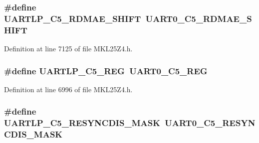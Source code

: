 \subsubsection[{\texorpdfstring{U\+A\+R\+T\+L\+P\+\_\+\+C5\+\_\+\+R\+D\+M\+A\+E\+\_\+\+S\+H\+I\+FT}{UARTLP_C5_RDMAE_SHIFT}}]{\setlength{\rightskip}{0pt plus 5cm}\#define U\+A\+R\+T\+L\+P\+\_\+\+C5\+\_\+\+R\+D\+M\+A\+E\+\_\+\+S\+H\+I\+FT~{\bf U\+A\+R\+T0\+\_\+\+C5\+\_\+\+R\+D\+M\+A\+E\+\_\+\+S\+H\+I\+FT}}\hypertarget{group___backward___compatibility___symbols_gabf5bb3ff2b944bfdbfd8b05f29c7b678}{}\label{group___backward___compatibility___symbols_gabf5bb3ff2b944bfdbfd8b05f29c7b678}


Definition at line 7125 of file M\+K\+L25\+Z4.\+h.

\subsubsection[{\texorpdfstring{U\+A\+R\+T\+L\+P\+\_\+\+C5\+\_\+\+R\+EG}{UARTLP_C5_REG}}]{\setlength{\rightskip}{0pt plus 5cm}\#define U\+A\+R\+T\+L\+P\+\_\+\+C5\+\_\+\+R\+EG~{\bf U\+A\+R\+T0\+\_\+\+C5\+\_\+\+R\+EG}}\hypertarget{group___backward___compatibility___symbols_gabc0ed230faba55a9874ca37a592326b3}{}\label{group___backward___compatibility___symbols_gabc0ed230faba55a9874ca37a592326b3}


Definition at line 6996 of file M\+K\+L25\+Z4.\+h.

\subsubsection[{\texorpdfstring{U\+A\+R\+T\+L\+P\+\_\+\+C5\+\_\+\+R\+E\+S\+Y\+N\+C\+D\+I\+S\+\_\+\+M\+A\+SK}{UARTLP_C5_RESYNCDIS_MASK}}]{\setlength{\rightskip}{0pt plus 5cm}\#define U\+A\+R\+T\+L\+P\+\_\+\+C5\+\_\+\+R\+E\+S\+Y\+N\+C\+D\+I\+S\+\_\+\+M\+A\+SK~{\bf U\+A\+R\+T0\+\_\+\+C5\+\_\+\+R\+E\+S\+Y\+N\+C\+D\+I\+S\+\_\+\+M\+A\+SK}}\hypertarget{group___backward___compatibility___symbols_ga6c8f73a689a6c4d5d7425325b8c3bde2}{}\label{group___backward___compatibility___symbols_ga6c8f73a689a6c4d5d7425325b8c3bde2}


